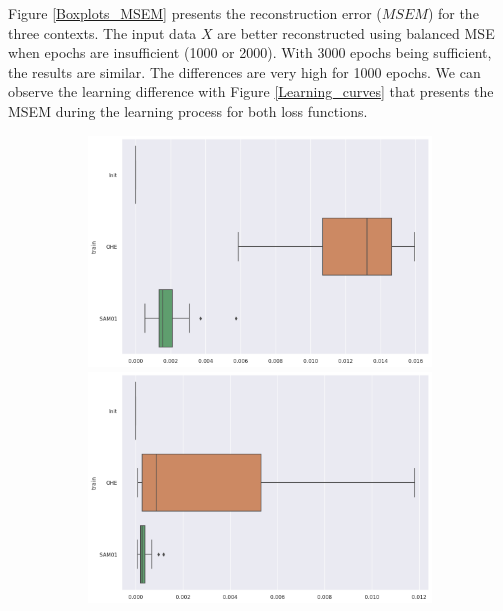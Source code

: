 \documentclass{article}
\theoremstyle{definition}
\begin{document}
Figure \ref{Boxplots_MSEM} presents the reconstruction error ($MSEM$) for the three contexts. The input data $X$ are better reconstructed using balanced MSE when epochs are insufficient (1000 or 2000). With 3000 epochs being sufficient, the results are similar. The differences are very high for 1000 epochs. We can observe the learning difference with Figure \ref{Learning_curves} that presents the MSEM during the learning process for both loss functions.


\begin{figure}[ht]
     \centering
     \begin{subfigure}[b]{0.15\textwidth}
         \centering
             \includegraphics[width=\textwidth]{imgs/Illu/1000Epochs/Imb/Boxplots_MSEM.png}
         \quad
         \includegraphics[width=\textwidth]{imgs/Illu/2000Epochs/Imb/Boxplots_MSEM.png}
         \quad

\end{subfigure}
\end{figure}
\end{document}
